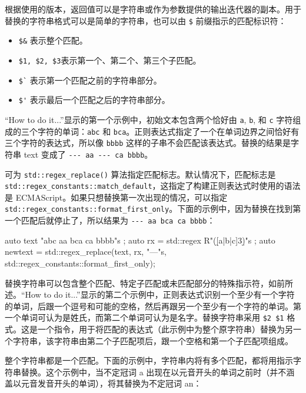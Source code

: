 根据使用的版本，返回值可以是字符串或作为参数提供的输出迭代器的副本。用于替换的字符串格式可以是简单的字符串，也可以由 \verb|$| 前缀指示的匹配标识符：

\begin{itemize}
\item
\verb|$&| 表示整个匹配。

\item
\verb|$1, $2, $3|表示第一个、第二个、第三个子匹配。

\item
\verb|$`| 表示第一个匹配之前的字符串部分。

\item
\verb|$'| 表示最后一个匹配之后的字符串部分。
\end{itemize}

“How to do it...”显示的第一个示例中，初始文本包含两个恰好由 \verb|a|, \verb|b|, 和 \verb|c| 字符组成的三个字符的单词：\verb|abc| 和 \verb|bca|。正则表达式指定了一个在单词边界之间恰好有三个字符的表达式，所以像 \verb|bbbb| 这样的子串不会匹配该表达式。替换的结果是字符串 text 变成了 \verb|--- aa --- ca bbbb|。

可为 \verb|std::regex_replace()| 算法指定匹配标志。默认情况下，匹配标志是 \verb|std::regex_constants::match_default|，这指定了构建正则表达式时使用的语法是 ECMAScript。如果只想替换第一次出现的情况，可以指定 \verb|std::regex_constants::format_first_only|。下面的示例中，因为替换在找到第一个匹配后就停止了，所以结果为 \verb|--- aa bca ca bbbb|：

\begin{cpp}
auto text{ "abc aa bca ca bbbb"s };
auto rx = std::regex{ R"(\b[a|b|c]{3}\b)"s };
auto newtext = std::regex_replace(text, rx, "---"s,
                 std::regex_constants::format_first_only);
\end{cpp}

替换字符串可以包含整个匹配、特定子匹配或未匹配部分的特殊指示符，如前所述。“How to do it...”显示的第二个示例中，正则表达式识别一个至少有一个字符的单词，后跟一个逗号和可能的空格，然后再跟另一个至少有一个字符的单词。第一个单词可认为是姓氏，而第二个单词可认为是名字。替换字符串采用 \verb|$2 $1| 格式。这是一个指令，用于将匹配的表达式（此示例中为整个原字符串）替换为另一个字符串，该字符串由第二个子匹配项后，跟一个空格和第一个子匹配项组成。

整个字符串都是一个匹配。下面的示例中，字符串内将有多个匹配，都将用指示字符串替换。这个示例中，当不定冠词 a 出现在以元音开头的单词之前时（并不涵盖以元音发音开头的单词），将其替换为不定冠词 an：


